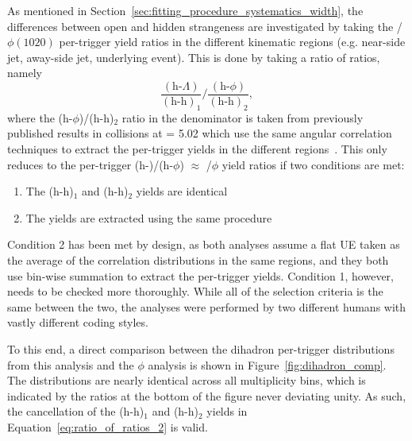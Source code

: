 As mentioned in Section~\ref{sec:fitting_procedure_systematics_width}, the differences between open and hidden strangeness are investigated by taking the \lmb/$\phi(1020)$ per-trigger yield ratios in the different kinematic regions (e.g. near-side jet, away-side jet, underlying event). This is done by taking a ratio of ratios, namely
%
\begin{equation}
    \label{eq:ratio_of_ratios_2}
    \frac{(\text{h-}\Lambda)}{(\text{h-h})_{1}}/\frac{(\text{h-}\phi)}{(\text{h-h})_{2}},
\end{equation}
%
where the (h-$\phi$)/(h-h)$_2$ ratio in the denominator is taken from previously published results in \pPb collisions at \snn = 5.02 \TeV which use the same angular correlation techniques to extract the per-trigger yields in the different regions~\cite{JustinPaper}. This only reduces to the per-trigger (h-\lmb)/(h-$\phi$) $\approx$ \lmb/$\phi$ yield ratios if two conditions are met:
%
\begin{enumerate}
    \item The (h-h)$_1$ and (h-h)$_2$ yields are identical
    \item The yields are extracted using the same procedure
\end{enumerate}
% 
Condition 2 has been met by design, as both analyses assume a flat UE taken as the average of the correlation distributions in the same \dphi regions, and they both use bin-wise summation to extract the per-trigger yields. Condition 1, however, needs to be checked more thoroughly. While all of the selection criteria is the same between the two, the analyses were performed by two different humans with vastly different coding styles.

To this end, a direct comparison between the dihadron per-trigger \dphi distributions from this analysis and the $\phi$ analysis is shown in Figure~\ref{fig:dihadron_comp}. The distributions are nearly identical across all multiplicity bins, which is indicated by the ratios at the bottom of the figure never deviating unity. As such, the cancellation of the (h-h)$_1$ and (h-h)$_2$ yields in Equation~\ref{eq:ratio_of_ratios_2} is valid.


